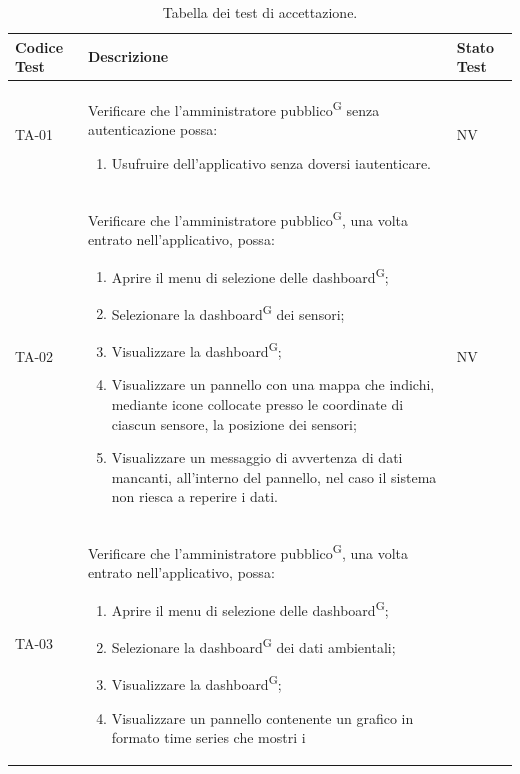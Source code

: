 \documentclass[8pt]{article}
\newcommand{\glossterm}[1]{#1\textsuperscript{G}} %
\begin{document}
\renewcommand{\arraystretch}{2.5}
\begin{longtable}{|>{\centering}p{2cm}|>{\RaggedRight}m{12cm}|>{\centering\arraybackslash}p{2cm}|}
    \hline
    \rowcolor{white}
    \textbf{Codice Test} & \textbf{Descrizione} & \textbf{Stato Test} \\
    \hline
    \endfirsthead 
    \rowcolor{white}
    \caption{Tabella dei test di accettazione.} 
    \label{table:Tabella dei test di accettazione}
    \endlastfoot  
    TA-01 & Verificare che l’\glossterm{amministratore pubblico} senza autenticazione possa:
    \begin{enumerate}
        \setlength\itemsep{0em}
        \item Usufruire dell’applicativo senza doversi iautenticare.
    \end{enumerate} & NV \\
    \hline
    TA-02 & Verificare che l’\glossterm{amministratore pubblico}, una volta entrato nell'applicativo, possa:
    \begin{enumerate}
        \setlength\itemsep{0em}
        \item Aprire il menu di selezione delle \glossterm{dashboard};
        \item Selezionare la \glossterm{dashboard} dei sensori;
        \item Visualizzare la \glossterm{dashboard};
        \item Visualizzare un pannello con una mappa che indichi, mediante icone collocate presso le coordinate di ciascun sensore, la posizione dei sensori;
        \item Visualizzare un messaggio di avvertenza di dati mancanti, all’interno del pannello, nel caso il sistema non riesca a reperire i dati.
    \end{enumerate}
    & NV \\
    \hline
    TA-03 & Verificare che l’\glossterm{amministratore pubblico}, una volta entrato nell'applicativo, possa:
    \begin{enumerate}
        \setlength\itemsep{0em}
        \item Aprire il menu di selezione delle \glossterm{dashboard};
        \item Selezionare la \glossterm{dashboard} dei dati ambientali;
        \item Visualizzare la \glossterm{dashboard};
        \item Visualizzare un pannello contenente un grafico in formato time series che mostri i

\end{enumerate}
\end{longtable}
\end{document}
